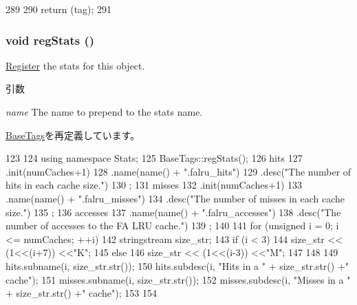 \begin{DoxyCode}
289     {
290         return (tag);
291     }
\end{DoxyCode}
\hypertarget{classFALRU_a4dc637449366fcdfc4e764cdf12d9b11}{
\subsubsection[{regStats}]{\setlength{\rightskip}{0pt plus 5cm}void regStats ()}}
\label{classFALRU_a4dc637449366fcdfc4e764cdf12d9b11}
\hyperlink{classRegister}{Register} the stats for this object. 
\begin{DoxyParams}{引数}
\item[{\em name}]The name to prepend to the stats name. \end{DoxyParams}


\hyperlink{classBaseTags_a4dc637449366fcdfc4e764cdf12d9b11}{BaseTags}を再定義しています。


\begin{DoxyCode}
123 {
124     using namespace Stats;
125     BaseTags::regStats();
126     hits
127         .init(numCaches+1)
128         .name(name() + ".falru_hits")
129         .desc("The number of hits in each cache size.")
130         ;
131     misses
132         .init(numCaches+1)
133         .name(name() + ".falru_misses")
134         .desc("The number of misses in each cache size.")
135         ;
136     accesses
137         .name(name() + ".falru_accesses")
138         .desc("The number of accesses to the FA LRU cache.")
139         ;
140 
141     for (unsigned i = 0; i <= numCaches; ++i) {
142         stringstream size_str;
143         if (i < 3){
144             size_str << (1<<(i+7)) <<"K";
145         } else {
146             size_str << (1<<(i-3)) <<"M";
147         }
148 
149         hits.subname(i, size_str.str());
150         hits.subdesc(i, "Hits in a " + size_str.str() +" cache");
151         misses.subname(i, size_str.str());
152         misses.subdesc(i, "Misses in a " + size_str.str() +" cache");
153     }
154 }
\end{DoxyCode}


